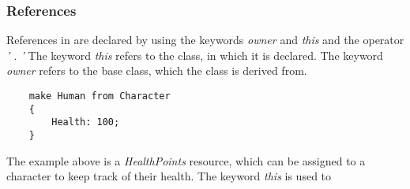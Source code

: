 \subsubsection*{References}
References in \langname{} are declared by using the keywords \emph{owner} and \emph{this} and the operator \emph{' . '} The keyword \emph{this} refers to the class, in which it is declared. The keyword \emph{owner} refers to the base class, which the class is derived from. 
\begin{lstlisting}
	make Human from Character
	{
		Health: 100;
	}
\end{lstlisting}
The example above is a \emph{HealthPoints} resource, which can be assigned to a character to keep track of their health. The keyword \emph{this} is used to 